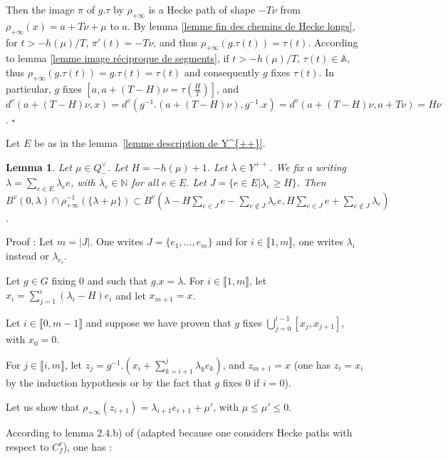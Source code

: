 \documentclass[12pt]{article}
\theoremstyle{plain}
\newtheorem{lemme}[thm]{Lemma}
\theoremstyle{definition}
\newcommand{\N}{\mathbb{N}}
\begin{document}
Then the image $\pi$ of $g.\tau$ by $\rho_{+\infty}$ is a Hecke path of shape $-T\nu$ from $\rho_{+\infty}(x)=a+T\nu +\mu$ to $a$. By lemma \ref{lemme fin des chemins de Hecke longs}, for $t>-h(\mu)/T$, $\pi'(t)=-T\nu$, and thus $\rho_{+\infty}(g.\tau(t))=\tau(t)$. According to lemma \ref{lemme image réciproque de segments}, if $t>-h(\mu)/T$, $\tau(t)\in \mathbb{A}$, thus $\rho_{+\infty}(g.\tau(t))=g.\tau(t)=\tau(t)$ and consequently $g$ fixes  $\tau(t)$. In particular, $g$ fixes $[a,a+(T-H)\nu=\tau(\frac{H}{T})]$, and $d^v(a+(T-H)\nu,x)=d^v(g^{-1}.(a+(T-H)\nu),g^{-1}.x)=d^v(a+(T-H)\nu,a+T\nu)=H\nu$. $\square$











\vspace{5mm}

Let $E$ be as in the lemma~\ref{lemme description de Y^{++}}. 
 
\begin{lemme}\label{lemme majoration du cardinal des boules}
 Let $\mu \in Q^\vee_-$. Let $H=-h(\mu)+1$. Let $\lambda\in Y^{++}$. We fix a writing  $\lambda=\sum_{e\in E}\lambda_e e$, with $\lambda_e\in \N$ for all $e\in E$. Let $J=\{e\in E | \lambda_e \geq H\}$. Then $B^v(0,\lambda)\cap \rho_{+\infty}^{-1}(\{\lambda+\mu\})\subset B^v(\lambda-H\sum_{e\in J} e-\sum_{e\notin J}\lambda_e e, H\sum_{e\in J}e+\sum_{e\notin J}\lambda_ e)$. 
\end{lemme}
 
Proof : Let $m=|J|$. One writes $J=\{e_1,\ldots,e_m\}$ and for $i\in \llbracket 1,m\rrbracket$, one writes $\lambda_i$ instead or $\lambda_{e_i}$.
 
Let $g\in G$ fixing $0$ and such that $g.x=\lambda$. For $i\in \llbracket 1,m\rrbracket$, let $x_i=\sum_{j=1}^i (\lambda_i-H)e_i$ and let $x_{m+1}=x$.
 
Let $i\in \llbracket 0,m-1\rrbracket$ and suppose we have proven that $g$ fixes $\bigcup_{j=0}^{i-1}[x_j,x_{j+1}]$, with $x_0=0$.
 
 
For $j\in\llbracket i,m\rrbracket$, let $z_j=g^{-1}.(x_{i}+\sum_{k=i+1}^j \lambda_k e_k)$, and $z_{m+1}=x$ (one has $z_i=x_i$ by the induction hypothesis or by the fact that $g$ fixes $0$ if $i=0$).

Let us show that $\rho_{+\infty}(z_{i+1})=\lambda_{i+1}e_{i+1}+\mu'$, with $\mu\leq \mu' \leq 0$.

According to lemma 2.4.b) of \cite{gaussent2014spherical} (adapted because one considers Hecke paths with respect to $C^v_f$), one has : 
\end{document}
